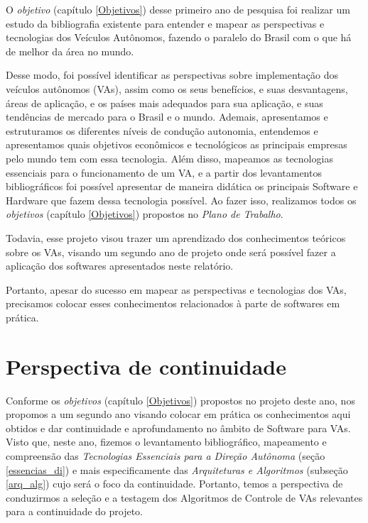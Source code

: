 O \textit{objetivo} (capítulo \ref{Objetivos}) desse primeiro ano de pesquisa foi realizar um estudo da bibliografia existente para entender e mapear as perspectivas e tecnologias dos Veículos Autônomos, fazendo o paralelo do Brasil com o que há de melhor da área no mundo. 

Desse modo, foi possível identificar as perspectivas sobre implementação dos veículos autônomos (VAs), assim como os seus benefícios, e suas desvantagens, áreas de aplicação, e os países mais adequados para sua aplicação, e suas tendências de mercado para o Brasil e o mundo.
Ademais, apresentamos e estruturamos os diferentes níveis de condução autonomia, entendemos e apresentamos quais objetivos econômicos e tecnológicos as principais empresas pelo mundo tem com essa tecnologia.
Além disso, mapeamos as tecnologias essenciais para o funcionamento de um VA, e a partir dos levantamentos bibliográficos foi possível apresentar de maneira didática os principais Software e Hardware que fazem dessa tecnologia possível.
Ao fazer isso, realizamos todos os \textit{objetivos} (capítulo \ref{Objetivos}) propostos no \textit{Plano de Trabalho}.

Todavia, esse projeto visou trazer um aprendizado dos conhecimentos teóricos sobre os VAs, visando um segundo ano de projeto onde será possível fazer a aplicação dos softwares apresentados neste relatório.

Portanto, apesar do sucesso em mapear as perspectivas e tecnologias dos VAs, precisamos colocar esses conhecimentos relacionados à parte de softwares em prática.



\chapter{Perspectiva de continuidade} \label{continuidade}

Conforme os \textit{objetivos} (capítulo \ref{Objetivos}) propostos no projeto deste ano, nos propomos a um segundo ano visando colocar em prática os conhecimentos aqui obtidos e dar continuidade e aprofundamento no âmbito de Software para VAs. Visto que, neste ano, fizemos o levantamento bibliográfico, mapeamento e compreensão das \textit{Tecnologias Essenciais para a Direção Autônoma} (seção \ref{essencias_di}) e mais especificamente das \textit{Arquiteturas e Algoritmos} (subseção \ref{arq_alg}) cujo será o foco da continuidade. Portanto, temos a perspectiva de conduzirmos a seleção e a testagem dos Algoritmos de Controle de VAs relevantes para a continuidade do projeto.

